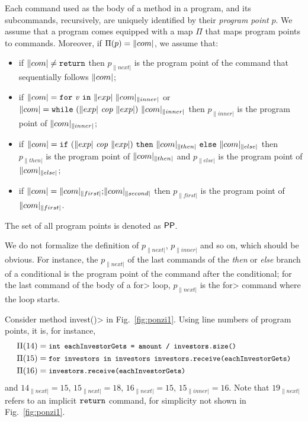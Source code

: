 \begin{definition}\label{def:program_point}
  Each command used as the body of a method in a program, and its subcommands,
  recursively, are uniquely identified by their \emph{program point} $p$.
  We assume that a program comes equipped
  with a map $\Pi$ that maps program points
  to commands. Moreover, if $\Pi(p)=\com$, we assume that:
  \begin{itemize}
  \item if $\com\not=\return$ then $p_{\|next|}$ is the program point
    of the command that sequentially follows $\com$;
  \item if $\com=\for{\mathit{v}}{\exp}{\com_{\|inner|}}$
    or $\com=\while{\exp}{\exp}{\com_{\|inner|}}$ then
    $p_{\|inner|}$ is the program point of $\com_{\|inner|}$;
  \item if $\com=\ife{\exp}{\exp}{\com_{\|then|}}{\com_{\|else|}}$ then
    $p_{\|then|}$ is the program point of $\com_{\|then|}$ and
    $p_{\|else|}$ is the program point of $\com_{\|else|}$;
  \item if $\com=\sequence{\com_{\|first|}}{\com_{\|second|}}$ then
    $p_{\|first|}$ is the program point of $\com_{\|first|}$.
  \end{itemize}
  The set of all program points is denoted as $\mathsf{PP}$.
\end{definition}
%
We do not formalize the definition of $p_{\|next|}$, $p_{\|inner|}$ and so on, which
should be obvious. For instance, the $p_{\|next|}$ of the last commands of the \emph{then} or
\emph{else} branch of a conditional is the program point of the
command after the conditional; for the last command of the body of a \<for> loop,
$p_{\|next|}$ is the \<for> command where the loop starts.
%
\begin{example}
  Consider method \<invest()> in Fig.~\ref{fig:ponzi1}. Using line numbers of program points,
  it is, for instance,
  \begin{align*}
    \Pi(14)&=\<int eachInvestorGets = amount / investors.size()>\\
    \Pi(15)&=\<for\ investors\ in\ investors\ investors.receive(eachInvestorGets)>\\
    \Pi(16)&=\<investors.receive(eachInvestorGets)>
  \end{align*}
  and $14_{\|next|}=15$, $15_{\|next|}=18$, $16_{\|next|}=15$, $15_{\|inner|}=16$. Note that
  $19_{\|next|}$ refers to an implicit $\mathtt{return}$ command, for simplicity not shown in Fig.~\ref{fig:ponzi1}.
\end{example}

